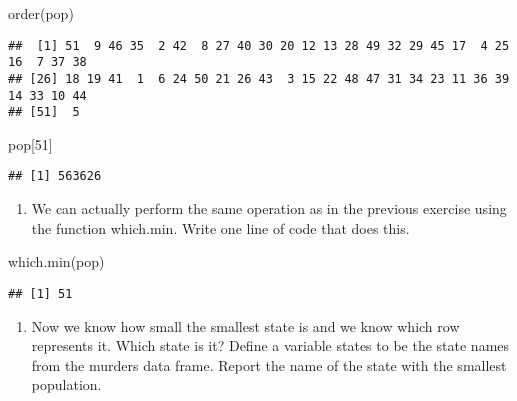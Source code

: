 \documentclass[
]{article}
\newenvironment{Shaded}{\begin{snugshade}}{\end{snugshade}}
\newcommand{\DecValTok}[1]{\textcolor[rgb]{0.00,0.00,0.81}{#1}}
\newcommand{\FunctionTok}[1]{\textcolor[rgb]{0.00,0.00,0.00}{#1}}
\newcommand{\NormalTok}[1]{#1}
\newcommand{\OtherTok}[1]{\textcolor[rgb]{0.56,0.35,0.01}{#1}}
\newcommand{\SpecialCharTok}[1]{\textcolor[rgb]{0.00,0.00,0.00}{#1}}
\providecommand{\tightlist}{%
  \setlength{\itemsep}{0pt}\setlength{\parskip}{0pt}}
\begin{document}
\begin{Shaded}
\begin{Highlighting}[]
\FunctionTok{order}\NormalTok{(pop)}
\end{Highlighting}
\end{Shaded}

\begin{verbatim}
##  [1] 51  9 46 35  2 42  8 27 40 30 20 12 13 28 49 32 29 45 17  4 25 16  7 37 38
## [26] 18 19 41  1  6 24 50 21 26 43  3 15 22 48 47 31 34 23 11 36 39 14 33 10 44
## [51]  5
\end{verbatim}

\begin{Shaded}
\begin{Highlighting}[]
\NormalTok{pop[}\DecValTok{51}\NormalTok{]}
\end{Highlighting}
\end{Shaded}

\begin{verbatim}
## [1] 563626
\end{verbatim}

\begin{enumerate}
\def\labelenumi{\arabic{enumi}.}
\setcounter{enumi}{2}
\tightlist
\item
  We can actually perform the same operation as in the previous exercise
  using the function which.min. Write one line of code that does this.
\end{enumerate}

\begin{Shaded}
\begin{Highlighting}[]
\FunctionTok{which.min}\NormalTok{(pop)}
\end{Highlighting}
\end{Shaded}

\begin{verbatim}
## [1] 51
\end{verbatim}

\begin{enumerate}
\def\labelenumi{\arabic{enumi}.}
\setcounter{enumi}{3}
\tightlist
\item
  Now we know how small the smallest state is and we know which row
  represents it. Which state is it? Define a variable states to be the
  state names from the murders data frame. Report the name of the state
  with the smallest population.
\end{enumerate}

\begin{Shaded}
\end{Shaded}
\end{document}
